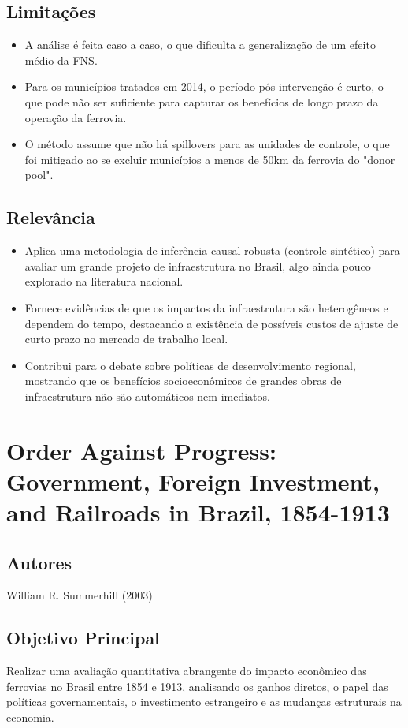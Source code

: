 \documentclass[12pt]{article}
\begin{document}
\subsection*{Limitações}
\begin{itemize}
    \item A análise é feita caso a caso, o que dificulta a generalização de um efeito médio da FNS.
    \item Para os municípios tratados em 2014, o período pós-intervenção é curto, o que pode não ser suficiente para capturar os benefícios de longo prazo da operação da ferrovia.
    \item O método assume que não há spillovers para as unidades de controle, o que foi mitigado ao se excluir municípios a menos de 50km da ferrovia do "donor pool".
\end{itemize}

\subsection*{Relevância}
\begin{itemize}
    \item Aplica uma metodologia de inferência causal robusta (controle sintético) para avaliar um grande projeto de infraestrutura no Brasil, algo ainda pouco explorado na literatura nacional.
    \item Fornece evidências de que os impactos da infraestrutura são heterogêneos e dependem do tempo, destacando a existência de possíveis custos de ajuste de curto prazo no mercado de trabalho local.
    \item Contribui para o debate sobre políticas de desenvolvimento regional, mostrando que os benefícios socioeconômicos de grandes obras de infraestrutura não são automáticos nem imediatos.
\end{itemize}
\newpage

\section{Order Against Progress: Government, Foreign Investment, and Railroads in Brazil, 1854-1913}

\subsection*{Autores}
William R. Summerhill (2003)

\subsection*{Objetivo Principal}
Realizar uma avaliação quantitativa abrangente do impacto econômico das ferrovias no Brasil entre 1854 e 1913, analisando os ganhos diretos, o papel das políticas governamentais, o investimento estrangeiro e as mudanças estruturais na economia.
\end{document}
